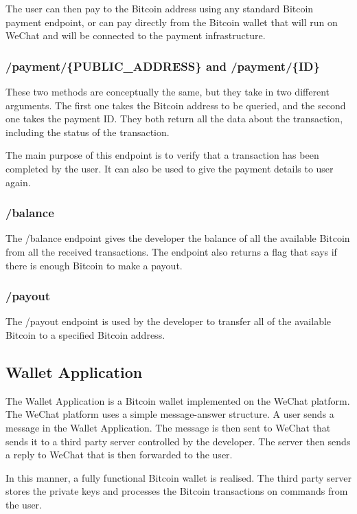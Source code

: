 The user can then pay to the Bitcoin address using any standard Bitcoin payment endpoint, or can pay directly from the Bitcoin wallet that will run on WeChat and will be connected to the payment infrastructure.

\subsubsection{/payment/\{PUBLIC\_ADDRESS\} and /payment/\{ID\}}

These two methods are conceptually the same, but they take in two different arguments. The first one takes the Bitcoin address to be queried, and the second one takes the payment ID. They both return all the data about the transaction, including the status of the transaction. 

The main purpose of this endpoint is to verify that a transaction has been completed by the user. It can also be used to give the payment details to user again.

\subsubsection{/balance}

The /balance endpoint gives the developer the balance of all the available Bitcoin from all the received transactions. The endpoint also returns a flag that says if there is enough Bitcoin to make a payout.

\subsubsection{/payout}

The /payout endpoint is used by the developer to transfer all of the available Bitcoin to a specified Bitcoin address.

\subsection{Wallet Application}

The Wallet Application is a Bitcoin wallet implemented on the WeChat platform. The WeChat platform uses a simple message-answer structure. A user sends a message in the Wallet Application. The message is then sent to WeChat that sends it to a third party server controlled by the developer. The server then sends a reply to WeChat that is then forwarded to the user. 

In this manner, a fully functional Bitcoin wallet is realised. The third party server stores the private keys and processes the Bitcoin transactions on commands from the user.

